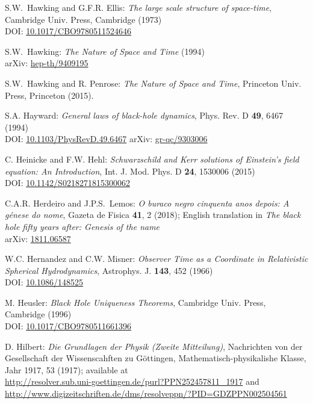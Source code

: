 \begin{thebibliography}{123}
S.W.~Hawking and G.F.R. Ellis: {\em The large scale structure of
space-time},
Cambridge Univ. Press, Cambridge (1973)\\
DOI: \href{https://doi.org/10.1017/CBO9780511524646}{10.1017/CBO9780511524646}

S.W.~Hawking: {\em The Nature of Space and Time} (1994)\\
arXiv: \href{https://arxiv.org/abs/hep-th/9409195}{hep-th/9409195}

S.W.~Hawking and R. Penrose: {\em The Nature of Space and Time},
Princeton Univ. Press, Princeton (2015).

S.A. Hayward:
{\em General laws of black-hole dynamics},
Phys. Rev. D {\bf 49}, 6467 (1994)\\
DOI: \href{https://doi.org/10.1103/PhysRevD.49.6467}{10.1103/PhysRevD.49.6467}\hfill
arXiv: \href{https://arxiv.org/abs/gr-qc/9303006}{gr-qc/9303006}

C. Heinicke and F.W. Hehl:
{\em Schwarzschild and Kerr solutions of Einstein's field equation: An Introduction},
Int. J. Mod. Phys. D {\bf 24}, 1530006 (2015)\\
DOI: \href{https://doi.org/10.1142/S0218271815300062}{10.1142/S0218271815300062}

C.A.R. Herdeiro and J.P.S.~Lemos:
\emph{O buraco negro cinquenta anos depois:
A génese do nome},
Gazeta de Fisica {\bf 41}, 2 (2018); English translation in
\emph{The black hole fifty years after: Genesis of the name}\\
arXiv: \href{https://arxiv.org/abs/1811.06587}{1811.06587}

W.C. Hernandez and C.W. Misner:
{\em Observer Time as a Coordinate in Relativistic Spherical Hydrodynamics},
Astrophys. J. {\bf 143}, 452 (1966) \\
DOI: \href{https://doi.org/10.1086/148525}{10.1086/148525}

M. Heusler:
{\em Black Hole Uniqueness Theorems},
Cambridge Univ. Press, Cambridge (1996) \\
DOI: \href{https://doi.org/10.1017/CBO9780511661396}{10.1017/CBO9780511661396}

D. Hilbert:
{\em Die Grundlagen der Physik (Zweite Mitteilung)},
Nachrichten von der Gesellschaft der Wissenscahften zu Göttingen,
Mathematisch-physikalishe Klasse, Jahr 1917, 53 (1917);
available at\\
\url{http://resolver.sub.uni-goettingen.de/purl?PPN252457811_1917} and\\
\url{http://www.digizeitschriften.de/dms/resolveppn/?PID=GDZPPN002504561}


\end{thebibliography}
